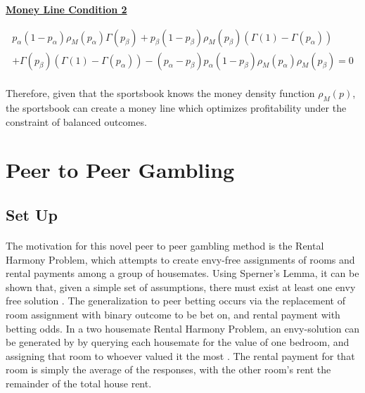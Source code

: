 \documentclass[12pt,letterpaper]{article}
\begin{document}
\vspace{10pt}

\begin{center}
\underline{\textbf{Money Line Condition 2}}
\end{center}
\vspace{-10pt}

\begin{equation}
\begin{split}
p_\alpha (1-p_\alpha) \rho_M(p_\alpha) \Gamma(p_\beta) + p_\beta (1-p_\beta) \rho_M(p_\beta) (\Gamma(1)-\Gamma(p_\alpha))  \hspace{10pt}\\
+ \Gamma(p_\beta)(\Gamma(1)-\Gamma(p_\alpha)) - (p_\alpha - p_\beta) p_\alpha (1 - p_\beta) \rho_M(p_\alpha) \rho_M(p_\beta) = 0
\end{split}
\end{equation}

\paragraph{} Therefore, given that the sportsbook knows the money density function $\rho_{M}(p)$, the sportsbook can create a money line which optimizes profitability under the constraint of balanced outcomes. 

\section{Peer to Peer Gambling}

\subsection{Set Up}

\paragraph{} The motivation for this novel peer to peer gambling method is the Rental Harmony Problem, which attempts to create envy-free assignments of rooms and rental payments among a group of housemates. Using Sperner's Lemma, it can be shown that, given a simple set of assumptions, there must exist at least one envy free solution \cite{rental_harmony_paper}.  The generalization to peer betting occurs via the replacement of room assignment with binary outcome to be bet on, and rental payment with betting odds. In a two housemate Rental Harmony Problem, an envy-solution can be generated by by querying each housemate for the value of one bedroom, and assigning that room to whoever valued it the most  \cite{planet_money_episode}. The rental payment for that room is simply the average of the responses, with the other room's rent the remainder of the total house rent. 
\end{document}
